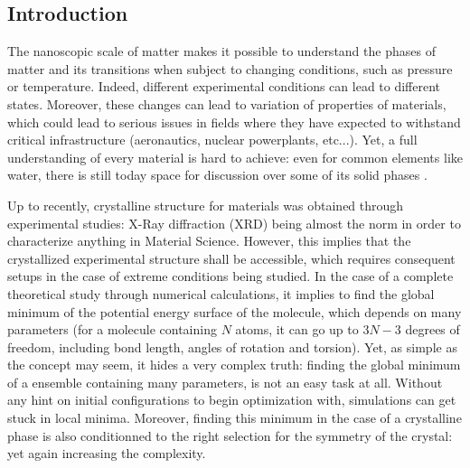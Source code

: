 \documentclass[11pt]{article}
\begin{document}
\begin{multicols}{2}
\section*{Introduction}

The nanoscopic scale of matter makes it possible to understand the phases of matter and its transitions when subject to changing conditions, such as pressure or temperature. Indeed, different experimental conditions can lead to different states. Moreover, these changes can lead to variation of properties of materials, which could lead to serious issues in fields where they have expected to withstand critical infrastructure (aeronautics, nuclear powerplants, etc...). Yet, a full understanding of every material is hard to achieve: even for common elements like water, there is still today space for discussion over some of its solid phases \cite{Hansen2021-bk}.

\noindent Up to recently, crystalline structure for materials was obtained through experimental studies: X-Ray diffraction (XRD) being almost the norm in order to characterize anything in Material Science. However, this implies that the crystallized experimental structure shall be accessible, which requires consequent setups in the case of extreme conditions being studied. In the case of a complete theoretical study through numerical calculations, it implies to find the global minimum of the potential energy surface of the molecule, which depends on many parameters (for a molecule containing $N$ atoms, it can go up to $3N-3$ degrees of freedom, including bond length, angles of rotation and torsion). Yet, as simple as the concept may seem, it hides a very complex truth: finding the global minimum of a ensemble containing many parameters, is not an easy task at all. Without any hint on initial configurations to begin optimization with, simulations can get stuck in local minima. Moreover, finding this minimum in the case of a crystalline phase is also conditionned to the right selection for the symmetry of the crystal: yet again increasing the complexity.


\end{multicols}
\end{document}
